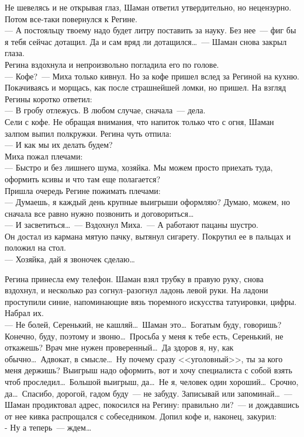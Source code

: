 Не шевелясь и не открывая глаз, Шаман ответил утвердительно, но нецензурно. 
Потом все-таки повернулся к Регине.\\
--- А постояльцу твоему надо будет литру поставить за науку. Без нее~--- фиг бы я 
тебя сейчас дотащил. Да и сам вряд ли дотащился\ldots~--- Шаман снова закрыл 
глаза.\\ 
Регина вздохнула и непроизвольно погладила его по голове.\\
--- Кофе?~--- Миха только кивнул. Но за кофе пришел вслед за Региной на кухню. 
Покачиваясь и морщась, как после страшнейшей ломки, но пришел. На взгляд Регины 
коротко ответил:\\
--- В гробу отлежусь. В любом случае, сначала~--- дела.\\
Сели с кофе. Не обращая внимания, что напиток только что с огня, Шаман залпом 
выпил полкружки. Регина чуть отпила:\\
--- И как мы их делать будем?\\
Миха пожал плечами:\\
--- Быстро и без лишнего шума, хозяйка. Мы можем просто приехать туда, оформить 
ксивы и что там еще полагается?\\
Пришла очередь Регине пожимать плечами:\\
--- Думаешь, я каждый день крупные выигрыши оформляю? Думаю, можем, но сначала 
все равно нужно позвонить и договориться\ldots\\
--- И засветиться\ldots~--- Вздохнул Миха.~--- А работают пацаны шустро.\\
Он достал из кармана мятую пачку, вытянул сигарету. Покрутил ее в пальцах и 
положил на стол.\\
--- Хозяйка, дай я звоночек сделаю\ldots

Регина принесла ему телефон. Шаман взял трубку в правую руку, снова вздохнул, и 
несколько раз согнул--разогнул ладонь левой руки. На ладони проступили синие, 
напоминающие вязь тюремного искусства татуировки, цифры. Набрал их.\\
--- Не болей, Серенький, не кашляй\ldots\ Шаман это\ldots\ Богатым буду, 
говоришь? Конечно, буду, поэтому и звоню\ldots\ Просьба у меня к тебе есть, Серенький, не 
откажешь? Врач мне нужен проверенный\ldots\ Да здоров я, ну, как обычно\ldots\ Адвокат, в 
смысле\ldots\ Ну почему сразу <<уголовный>>, ты за кого меня держишь? Выигрыш надо оформить, вот 
и хочу специалиста с собой взять чтоб проследил\ldots\ Большой выигрыш, 
да\ldots\ Не я, человек один хороший\ldots\ Срочно, да\ldots\ Спасибо, дорогой, гадом буду~--- 
не забуду. Записывай или запоминай\ldots~--- Шаман продиктовал адрес, покосился на Регину: 
правильно ли?~--- и дождавшись от нее кивка распрощался с собеседником. Допил 
кофе и, наконец, закурил:\\
- Ну а теперь~--- ждем\ldots

